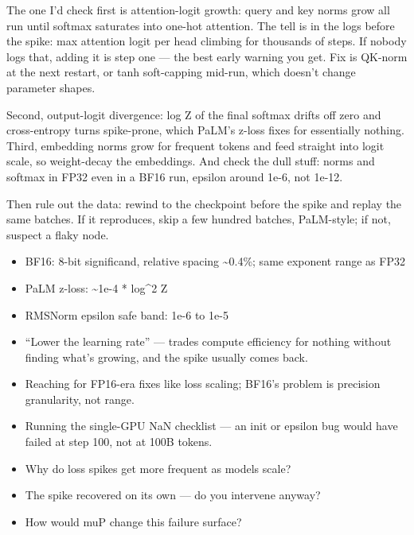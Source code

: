 \documentclass[10pt,twoside]{book}
\newcommand{\lab}[1]{\par\vspace{5pt}\noindent{\sffamily\footnotesize\bfseries\color{accent}#1}\par\vspace{1pt}}
\newcommand{\flab}[1]{\par\vspace{5pt}\noindent{\sffamily\footnotesize\bfseries\color{flag}#1}\par\vspace{1pt}}
\begin{document}
The one I'd check first is attention-logit growth: query and key norms grow all run until softmax saturates into one-hot attention. The tell is in the logs before the spike: max attention logit per head climbing for thousands of steps. If nobody logs that, adding it is step one --- the best early warning you get. Fix is QK-norm at the next restart, or tanh soft-capping mid-run, which doesn't change parameter shapes.\par\vspace{3pt}
Second, output-logit divergence: log Z of the final softmax drifts off zero and cross-entropy turns spike-prone, which PaLM's z-loss fixes for essentially nothing. Third, embedding norms grow for frequent tokens and feed straight into logit scale, so weight-decay the embeddings. And check the dull stuff: norms and softmax in FP32 even in a BF16 run, epsilon around 1e-6, not 1e-12.\par\vspace{3pt}
Then rule out the data: rewind to the checkpoint before the spike and replay the same batches. If it reproduces, skip a few hundred batches, PaLM-style; if not, suspect a flaky node.\par\vspace{3pt}
\lab{Numbers}
\begin{itemize}
\item BF16: 8-bit significand, relative spacing \textasciitilde{}0.4\%; same exponent range as FP32
\item PaLM z-loss: \textasciitilde{}1e-4 * log\textasciicircum{}2 Z
\item RMSNorm epsilon safe band: 1e-6 to 1e-5
\end{itemize}
\flab{Loses the signal}
\begin{itemize}
\item ``Lower the learning rate'' --- trades compute efficiency for nothing without finding what's growing, and the spike usually comes back.
\item Reaching for FP16-era fixes like loss scaling; BF16's problem is precision granularity, not range.
\item Running the single-GPU NaN checklist --- an init or epsilon bug would have failed at step 100, not at 100B tokens.
\end{itemize}
\lab{Then they ask}
\begin{itemize}
\item Why do loss spikes get more frequent as models scale?
\item The spike recovered on its own --- do you intervene anyway?
\item How would muP change this failure surface?
\end{itemize}
\end{document}
